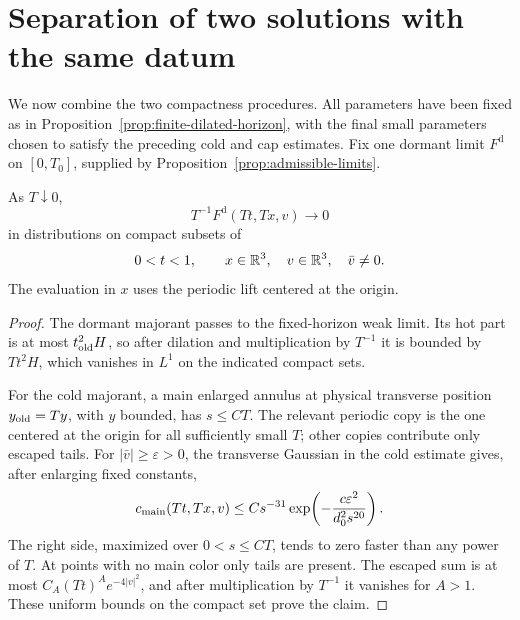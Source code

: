 \section{Separation of two solutions with the same datum}\label{sec:separation}

We now combine the two compactness procedures. All parameters have been
fixed as in Proposition~\ref{prop:finite-dilated-horizon}, with the final
small parameters chosen to satisfy the preceding cold and cap estimates.
Fix one dormant limit \(F^{\mathrm d}\) on \([0,T_0]\), supplied by
Proposition~\ref{prop:admissible-limits}.

\begin{lemma}\label{sep:dormant-vanishing}
As \(T\downarrow0\),
\[
T^{-1}F^{\mathrm d}(Tt,Tx,v)\longrightarrow0
\]
in distributions on compact subsets of
\[
0<t<1,\qquad x\in\mathbb R^3,\quad v\in\mathbb R^3,\quad \bar v\ne0 .
\]
The evaluation in \(x\) uses the periodic lift centered at the origin.
\end{lemma}

\begin{proof}
The dormant majorant passes to the fixed-horizon weak limit. Its hot
part is at most \(t_{\rm old}^2H\), so after dilation and multiplication
by \(T^{-1}\) it is bounded by \(Tt^2H\), which vanishes in \(L^1\) on
the indicated compact sets.

For the cold majorant, a main enlarged annulus at physical transverse
position \(y_{\rm old}=Ty\), with \(y\) bounded, has \(s\le C T\).
The relevant periodic copy is the one centered at the origin for all
sufficiently small \(T\); other copies contribute only escaped tails.
For \(|\bar v|\ge\varepsilon>0\), the transverse Gaussian in the
cold estimate gives, after enlarging fixed constants,
\[
c_{\rm main}(Tt,Tx,v)
 \le C s^{-31}\exp\!\left(-\frac{c\varepsilon^2}{d_0^2s^{20}}\right).
\]
The right side, maximized over \(0<s\le CT\), tends to zero faster
than any power of \(T\). At points with no main color only tails
are present. The escaped sum is at most
\(C_A(Tt)^Ae^{-4|v|^2}\), and after multiplication by \(T^{-1}\)
it vanishes for \(A>1\). These uniform bounds on the compact set
prove the claim.
\end{proof}

